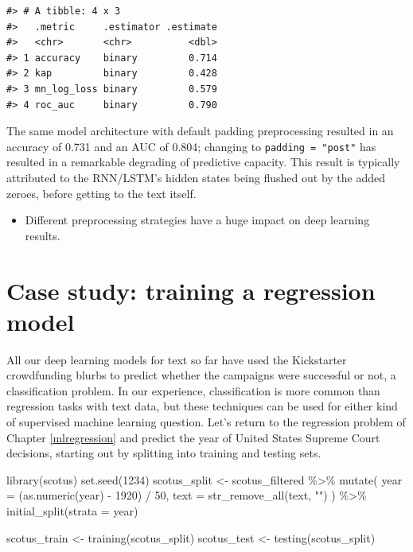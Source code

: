 \documentclass[
]{krantz}
\makeatletter
\newenvironment{Shaded}{\begin{snugshade}}{\end{snugshade}}
\newcommand{\AttributeTok}[1]{\textcolor[rgb]{0.77,0.63,0.00}{#1}}
\newcommand{\DecValTok}[1]{\textcolor[rgb]{0.00,0.00,0.81}{#1}}
\newcommand{\FunctionTok}[1]{\textcolor[rgb]{0.00,0.00,0.00}{#1}}
\newcommand{\NormalTok}[1]{#1}
\newcommand{\OtherTok}[1]{\textcolor[rgb]{0.56,0.35,0.01}{#1}}
\newcommand{\SpecialCharTok}[1]{\textcolor[rgb]{0.00,0.00,0.00}{#1}}
\newcommand{\StringTok}[1]{\textcolor[rgb]{0.31,0.60,0.02}{#1}}
\newenvironment{kframe}{%
\medskip{}
\setlength{\fboxsep}{.8em}
 \def\at@end@of@kframe{}%
 \ifinner\ifhmode%
  \def\at@end@of@kframe{\end{minipage}}%
  \begin{minipage}{\columnwidth}%
 \fi\fi%
 \def\FrameCommand##1{\hskip\@totalleftmargin \hskip-\fboxsep
 \colorbox{shadecolor}{##1}\hskip-\fboxsep
     \hskip-\linewidth \hskip-\@totalleftmargin \hskip\columnwidth}%
 \MakeFramed {\advance\hsize-\width
   \@totalleftmargin\z@ \linewidth\hsize
   \@setminipage}}%
 {\par\unskip\endMakeFramed%
 \at@end@of@kframe}
\renewenvironment{Shaded}{\begin{kframe}}{\end{kframe}}
\newenvironment{rmdblock}[1]
  {\begin{shaded*}
  \begin{itemize}[left = -1cm, labelsep = 1cm]
  \renewcommand{\labelitemi}{
    \raisebox{-.7\height}[0pt][0pt]{
      {\setkeys{Gin}{width=3em,keepaspectratio}\texttt{[image: images/\#1]}}
    }
  }
 
  \item
  }
  {
  \end{itemize}
  \end{shaded*}
  }
\newenvironment{rmdwarning}
  {\begin{rmdblock}{warning}}
  {\end{rmdblock}}
\makeatother
\begin{document}
\begin{verbatim}
#> # A tibble: 4 x 3
#>   .metric     .estimator .estimate
#>   <chr>       <chr>          <dbl>
#> 1 accuracy    binary         0.714
#> 2 kap         binary         0.428
#> 3 mn_log_loss binary         0.579
#> 4 roc_auc     binary         0.790
\end{verbatim}

The same model architecture with default padding preprocessing resulted in an accuracy of 0.731 and an AUC of 0.804; changing to \texttt{padding\ =\ "post"} has resulted in a remarkable degrading of predictive capacity. This result is typically attributed to the RNN/LSTM's hidden states being flushed out by the added zeroes, before getting to the text itself.

\begin{rmdwarning}
Different preprocessing strategies have a huge impact on deep learning
results.
\end{rmdwarning}

\hypertarget{case-study-training-a-regression-model}{%
\section{Case study: training a regression model}\label{case-study-training-a-regression-model}}

All our deep learning models for text so far have used the Kickstarter crowdfunding blurbs to predict whether the campaigns were successful or not, a classification problem. In our experience, classification is more common than regression tasks with text data, but these techniques can be used for either kind of supervised machine learning question. Let's return to the regression problem of Chapter \ref{mlregression} and predict the year of United States Supreme Court decisions, starting out by splitting into training and testing sets.

\begin{Shaded}
\begin{Highlighting}[]
\FunctionTok{library}\NormalTok{(scotus)}
\FunctionTok{set.seed}\NormalTok{(}\DecValTok{1234}\NormalTok{)}
\NormalTok{scotus\_split }\OtherTok{\textless{}{-}}\NormalTok{ scotus\_filtered }\SpecialCharTok{\%\textgreater{}\%}
  \FunctionTok{mutate}\NormalTok{(}
    \AttributeTok{year =}\NormalTok{ (}\FunctionTok{as.numeric}\NormalTok{(year) }\SpecialCharTok{{-}} \DecValTok{1920}\NormalTok{) }\SpecialCharTok{/} \DecValTok{50}\NormalTok{,}
    \AttributeTok{text =} \FunctionTok{str\_remove\_all}\NormalTok{(text, }\StringTok{"\textquotesingle{}"}\NormalTok{)}
\NormalTok{  ) }\SpecialCharTok{\%\textgreater{}\%}
  \FunctionTok{initial\_split}\NormalTok{(}\AttributeTok{strata =}\NormalTok{ year)}

\NormalTok{scotus\_train }\OtherTok{\textless{}{-}} \FunctionTok{training}\NormalTok{(scotus\_split)}
\NormalTok{scotus\_test }\OtherTok{\textless{}{-}} \FunctionTok{testing}\NormalTok{(scotus\_split)}
\end{Highlighting}
\end{Shaded}
\end{document}
